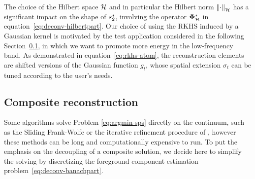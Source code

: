\documentclass[12pt]{article}
\begin{document}
        {
        \begin{remark}
            The choice of the Hilbert space $\mathcal{H}$ and in particular the Hilbert norm $\left\lVert\cdot\right\rVert_{\mathcal{H}}$ has a significant impact on the shape of $s_2^*$, involving the operator $\bm{\Phi}_\mathcal{H}^*$ in equation~\eqref{eq:deconv-hilbertpart}. %
            Our choice of using the RKHS induced by a Gaussian kernel is motivated by the test application considered in the following Section~\ref{sec:comp:reco}, in which we want to promote more energy in the low-frequency band. %
             As demonstrated in equation~\eqref{eq:rkhs-atom}, the reconstruction elements are shifted versions of the Gaussian function $g_t$, whose spatial extension $\sigma_t$ can be tuned according to the user's needs.
        \end{remark}
        }
        
        
    \subsection{Composite reconstruction}
    \label{sec:comp:reco}

        Some algorithms solve Problem \eqref{eq:argmin-sps}  directly on the continuum, such as the Sliding Frank-Wolfe \cite{denoyelle2019sliding} or the iterative refinement procedure of \cite{flinth2023grid}, however these methods can be long and computationally expensive to run.
        To put the emphasis on the decoupling of a composite solution, we decide here to simplify the solving by discretizing the foreground component estimation problem~\eqref{eq:deconv-banachpart}.
        
\end{document}
